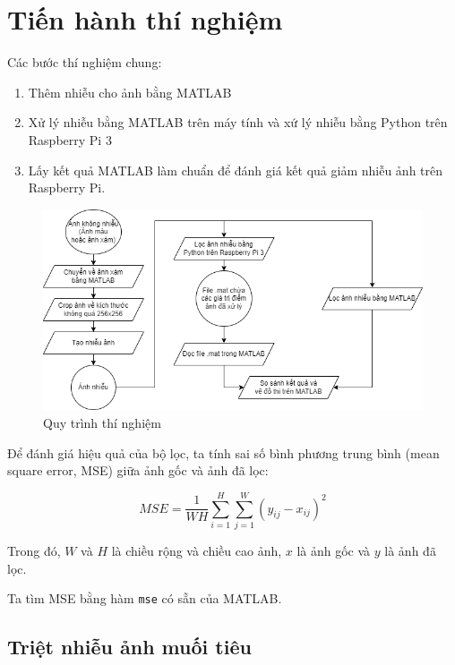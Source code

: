 \section{Tiến hành thí nghiệm}

Các bước thí nghiệm chung:

\begin{enumerate}
    \item Thêm nhiễu cho ảnh bằng MATLAB
    \item Xử lý nhiễu bằng MATLAB trên máy tính và xứ lý nhiễu bằng Python trên Raspberry Pi 3
    \item Lấy kết quả MATLAB làm chuẩn để đánh giá kết quả giảm nhiễu ảnh trên Raspberry Pi.
\end{enumerate}

\begin{figure}[H]
    \centering
    \includegraphics[width=\linewidth]{images/denoise_flowchart.png}
    \caption{Quy trình thí nghiệm}
\end{figure}

Để đánh giá hiệu quả của bộ lọc, ta tính sai số bình phương trung bình (mean square error, MSE) giữa ảnh gốc và ảnh đã lọc:

\begin{equation}\label{eqn:MSE}
    MSE = \frac{1}{WH} \sum_{i=1}^{H} \sum_{j=1}^{W} {(y_{ij} - x_{ij})^2}
\end{equation}

Trong đó, $W$ và $H$ là chiều rộng và chiều cao ảnh, $x$ là ảnh gốc và $y$ là ảnh đã lọc.

Ta tìm MSE bằng hàm \verb|mse| có sẵn của MATLAB.

\subsection{Triệt nhiễu ảnh muối tiêu}

